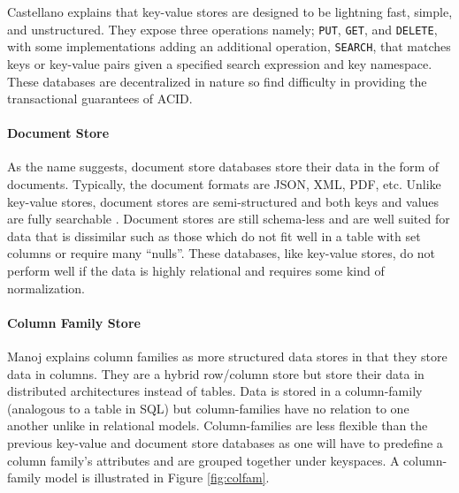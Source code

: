Castellano \cite{keyvalue-article} explains that key-value stores are designed to be lightning fast, simple, and unstructured. They expose three operations namely; \verb|PUT|, \verb|GET|, and \verb|DELETE|, with some implementations adding an additional operation, \verb|SEARCH|, that matches keys or key-value pairs given a specified search expression and key namespace. These databases are decentralized in nature so find difficulty in providing the transactional guarantees of ACID.

\paragraph{Document Store}

As the name suggests, document store databases store their data in the form of documents. Typically, the document formats are JSON, XML, PDF, etc. Unlike key-value stores, document stores are semi-structured and both keys and values are fully searchable \cite{nosql-db}. Document stores are still schema-less and are well suited for data that is dissimilar such as those which do not fit well in a table with set columns \cite{docstore-article} or require many ``nulls''. These databases, like key-value stores, do not perform well if the data is highly relational and requires some kind of normalization.

\paragraph{Column Family Store}

Manoj \cite{docstore-article} explains column families as more structured data stores in that they store data in columns. They are a hybrid row/column store but store their data in distributed architectures instead of tables. Data is stored in a column-family (analogous to a table in SQL) but column-families have no relation to one another unlike in relational models. Column-families are less flexible than the previous key-value and document store databases as one will have to predefine a column family's attributes and are grouped together under keyspaces. A column-family model is illustrated in Figure \ref{fig:colfam}.

